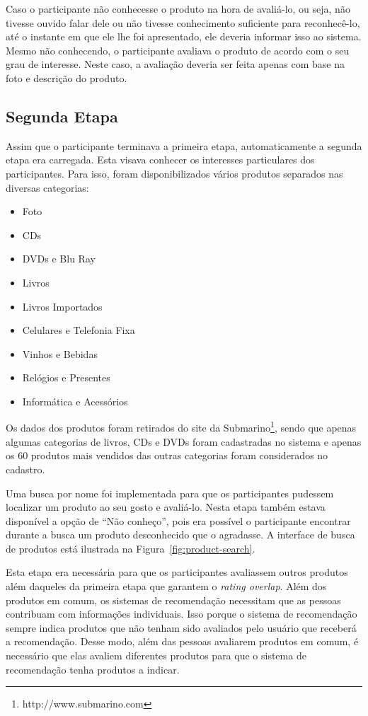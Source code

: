 Caso o participante não conhecesse o produto na hora de avaliá-lo, ou seja, não tivesse ouvido falar dele ou não tivesse conhecimento suficiente para reconhecê-lo, até o instante em que ele lhe foi apresentado, ele deveria informar isso ao sistema. Mesmo não conhecendo, o participante avaliava o produto de acordo com o seu grau de interesse. Neste caso, a avaliação deveria ser feita apenas com base na foto e descrição do produto.

\subsection{Segunda Etapa}
\label{cha:segunda_etapa}

Assim que o participante terminava a primeira etapa, automaticamente a segunda etapa era carregada. Esta visava conhecer os interesses particulares dos participantes. Para isso, foram disponibilizados vários produtos separados nas diversas categorias:

\begin{itemize}
  \item Foto
  \item CDs
  \item DVDs e Blu Ray
  \item Livros
  \item Livros Importados
  \item Celulares e Telefonia Fixa
  \item Vinhos e Bebidas
  \item Relógios e Presentes
  \item Informática e Acessórios
\end{itemize}

Os dados dos produtos foram retirados do site da Submarino\footnote{http://www.submarino.com}, sendo que apenas algumas categorias de livros, CDs e DVDs foram cadastradas no sistema e apenas os 60 produtos mais vendidos das outras categorias foram considerados no cadastro.

Uma busca por nome foi implementada para que os participantes pudessem localizar um produto ao seu gosto e avaliá-lo. Nesta etapa também estava disponível a opção de ``Não conheço'', pois era possível o participante encontrar durante a busca um produto desconhecido que o agradasse. A interface de busca de produtos está ilustrada na Figura~\ref{fig:product-search}.

Esta etapa era necessária para que os participantes avaliassem outros produtos além daqueles da primeira etapa que garantem o \textit{rating overlap}. Além dos produtos em comum, os sistemas de recomendação necessitam que as pessoas contribuam com informações individuais. Isso porque o sistema de recomendação sempre indica produtos que não tenham sido avaliados pelo usuário que receberá a recomendação. Desse modo, além das pessoas avaliarem produtos em comum, é necessário que elas avaliem diferentes produtos para que o sistema de recomendação tenha produtos a indicar.

